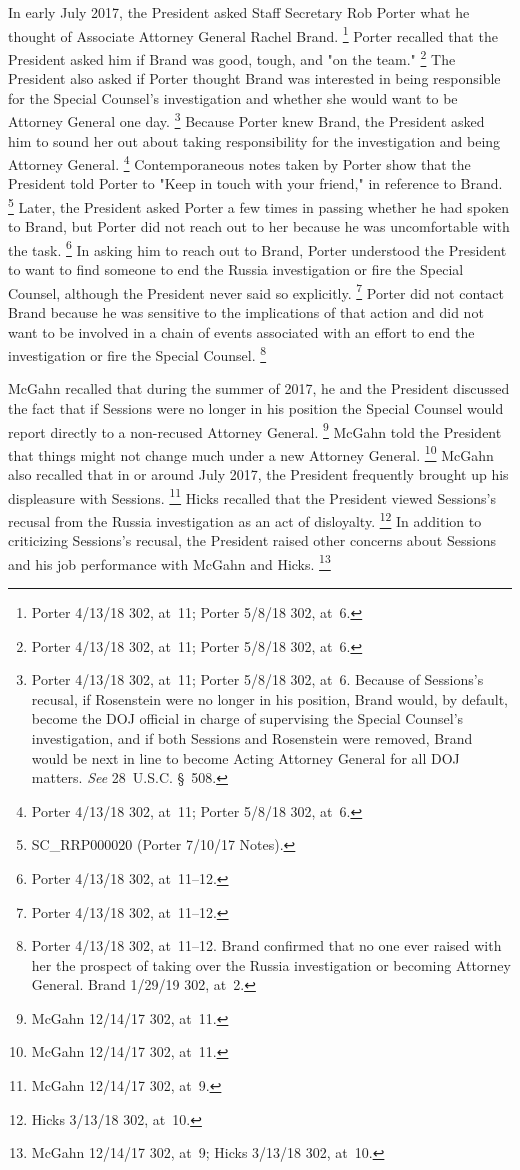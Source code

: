 {In early July 2017, the President asked Staff Secretary Rob Porter what he thought of Associate Attorney General Rachel Brand.%
\footnote{Porter 4/13/18 302, at~11;
Porter 5/8/18 302, at~6.}
Porter recalled that the President asked him if Brand was good, tough, and "on the team."%
\footnote{Porter 4/13/18 302, at~11;
Porter 5/8/18 302, at~6.}
The President also asked if Porter thought Brand was interested in being responsible for the Special Counsel's investigation and whether she would want to be Attorney General one day.%
\footnote{Porter 4/13/18 302, at~11;
Porter 5/8/18 302, at~6.
Because of Sessions's recusal, if Rosenstein were no longer in his position, Brand would, by default, become the DOJ official in charge of supervising the Special Counsel's investigation, and if both Sessions and Rosenstein were removed, Brand would be next in line to become Acting Attorney General for all DOJ matters.
\textit{See} 28~U.S.C. \S~508.}
Because Porter knew Brand, the President asked him to sound her out about taking responsibility for the investigation and being Attorney General.%
\footnote{Porter 4/13/18 302, at~11;
Porter 5/8/18 302, at~6.}
Contemporaneous notes taken by Porter show that the President told Porter to "Keep in touch with your friend," in reference to Brand.%
\footnote{SC\_RRP000020 (Porter 7/10/17 Notes).}
Later, the President asked Porter a few times in passing whether he had spoken to Brand, but Porter did not reach out to her because he was uncomfortable with the task.%
\footnote{Porter 4/13/18 302, at~11--12.}
In asking him to reach out to Brand, Porter understood the President to want to find someone to end the Russia investigation or fire the Special Counsel, although the President never said so explicitly.%
\footnote{Porter 4/13/18 302, at~11--12.}
Porter did not contact Brand because he was sensitive to the implications of that action and did not want to be involved in a chain of events associated with an effort to end the investigation or fire the Special Counsel.%
\footnote{Porter 4/13/18 302, at~11--12.
Brand confirmed that no one ever raised with her the prospect of taking over the Russia investigation or becoming Attorney General.
Brand 1/29/19 302, at~2.}

McGahn recalled that during the summer of 2017, he and the President discussed the fact that if Sessions were no longer in his position the Special Counsel would report directly to a non-recused Attorney General.%
\footnote{McGahn 12/14/17 302, at~11.}
McGahn told the President that things might not change much under a new Attorney General.%
\footnote{McGahn 12/14/17 302, at~11.}
McGahn also recalled that in or around July 2017, the President frequently brought up his displeasure with Sessions.%
\footnote{McGahn 12/14/17 302, at~9.}
Hicks recalled that the President viewed Sessions's recusal from the Russia investigation as an act of disloyalty.%
\footnote{Hicks 3/13/18 302, at~10.}
In addition to criticizing Sessions's recusal, the President raised other concerns about Sessions and his job performance with McGahn and Hicks.%
\footnote{McGahn 12/14/17 302, at~9;
Hicks 3/13/18 302, at~10.}

}
